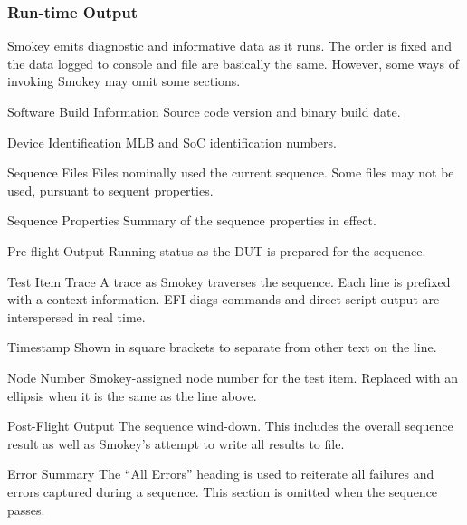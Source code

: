 \documentclass[11pt]{article}
\begin{document}
\subsubsection{Run-time Output}

Smokey emits diagnostic and informative data as it runs.  The order is fixed
and the data logged to console and file are basically the same.  However, some
ways of invoking Smokey may omit some sections.

\begin{LogSection}

\item[Software Build Information] Source code version and binary build date.

\item[Device Identification] MLB and SoC identification numbers.

\item[Sequence Files] Files nominally used the current sequence.  Some files
	may not be used, pursuant to sequent properties.

\item[Sequence Properties] Summary of the sequence properties in effect.

\item[Pre-flight Output] Running status as the DUT is prepared for the
	sequence.

\item[Test Item Trace] A trace as Smokey traverses the sequence.  Each line is
	prefixed with a context information.  EFI diags commands and direct
	script output are interspersed in real time.

	\begin{Definition}

	\item[Timestamp] Shown in square brackets to separate from other text
		on the line.

	\item[Node Number] Smokey-assigned node number for the test item.
		Replaced with an ellipsis when it is the same as the line
		above.

	\end{Definition}

\item[Post-Flight Output] The sequence wind-down.  This includes the overall
	sequence result as well as Smokey's attempt to write all results to
	file.

\item[Error Summary] The ``All Errors'' heading is used to reiterate all
	failures and errors captured during a sequence.  This section is
	omitted when the sequence passes.

\end{LogSection}
\end{document}
